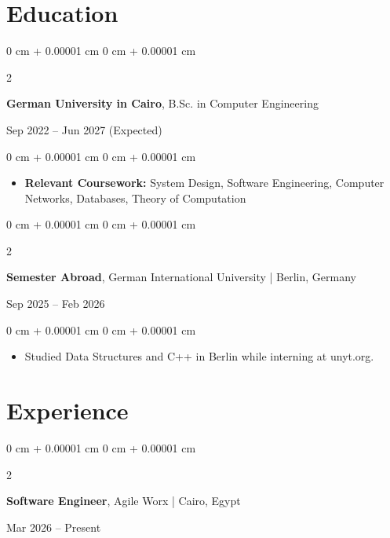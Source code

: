 \documentclass[10pt, letterpaper]{article}
\newenvironment{highlights}{
    \begin{itemize}[
        topsep=0.05 cm,
        parsep=0.05 cm,
        partopsep=0pt,
        itemsep=0pt,
        leftmargin=0 cm + 10pt
    ]
}{
    \end{itemize}
}
\newenvironment{onecolentry}{
    \begin{adjustwidth}{
        0 cm + 0.00001 cm
    }{
        0 cm + 0.00001 cm
    }
}{
    \end{adjustwidth}
}
\newenvironment{twocolentry}[2][]{
    \onecolentry
    \def\secondColumn{#2}
    \setcolumnwidth{\fill, 4.5 cm}
    \begin{paracol}{2}
}{
    \switchcolumn \raggedleft \secondColumn
    \end{paracol}
    \endonecolentry
}
\begin{document}
    \section{Education}

    \begin{twocolentry}{
        Sep 2022 – Jun 2027 (Expected)
    }
        \textbf{German University in Cairo}, B.Sc. in Computer Engineering
    \end{twocolentry}

    \vspace{0.06 cm}
    \begin{onecolentry}
        \begin{highlights}
            \item \textbf{Relevant Coursework:} System Design, Software Engineering, Computer Networks, Databases, Theory of Computation
        \end{highlights}
    \end{onecolentry}

    \vspace{0.08 cm}

    \begin{twocolentry}{
        Sep 2025 – Feb 2026
    }
        \textbf{Semester Abroad}, German International University | Berlin, Germany
    \end{twocolentry}

    \vspace{0.06 cm}
    \begin{onecolentry}
        \begin{highlights}
            \item Studied Data Structures and C++ in Berlin while interning at unyt.org.
        \end{highlights}
    \end{onecolentry}

    \section{Experience}

    \begin{twocolentry}{
        Mar 2026 – Present
    }
        \textbf{Software Engineer}, Agile Worx | Cairo, Egypt
    \end{twocolentry}
\end{document}
